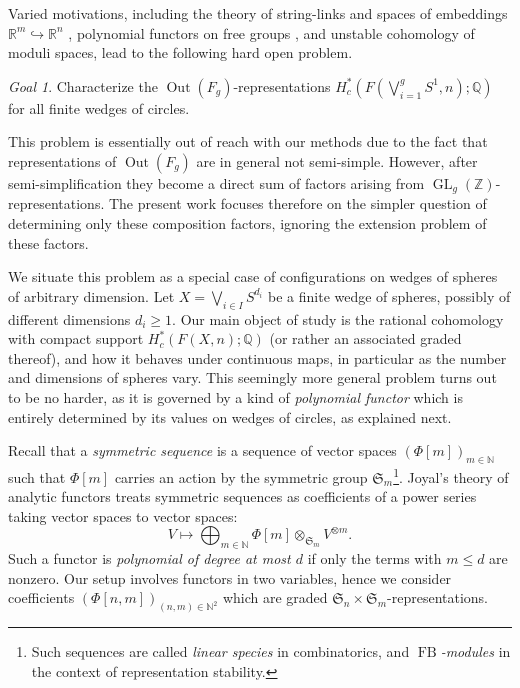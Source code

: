 \documentclass[12pt]{article}
\newcommand{\Z}{\mathbb{Z}}
\newcommand{\Q}{\mathbb{Q}}
\newcommand{\R}{\mathbb{R}}
\newcommand{\SymGroup}[1][n]{\mathfrak{S}_{#1}}
\newcommand{\into}{\hookrightarrow}
\DeclareMathOperator{\FB}{FB}
\DeclareMathOperator{\GL}{GL}
\DeclareMathOperator{\Out}{Out}
\theoremstyle{plain}
\theoremstyle{definition}
\theoremstyle{remark}
\newtheorem{goal}[thm]{Goal}
\begin{document}
Varied motivations, including the theory of string-links and spaces of embeddings $\R^m\into \R^n$ \cite{TW17,TW19}, polynomial functors on free groups \cite{HPV15,PV18}, and unstable cohomology of moduli spaces, lead to the following hard open problem.
\begin{goal}\label{goal:understand wedges of circles}
Characterize the $\Out(F_g)$-representations $H^*_c(F(\bigvee_{i=1}^g{S^1}, n); \Q)$ for all finite wedges of circles.
\end{goal}

This problem is essentially out of reach with our methods due to the fact that representations of $\Out(F_g)$ are in general not semi-simple. However, after semi-simplification they become a direct sum of factors arising from $\GL_g(\Z)$-representations. The present work focuses therefore on the simpler question of determining only these composition factors, ignoring the extension problem of these factors.

We situate this problem as a special case of configurations on wedges of spheres of arbitrary dimension. Let $X = \bigvee_{i\in I} S^{d_i}$ be a finite wedge of spheres, possibly of different dimensions $d_i \geq 1$. %
Our main object of study is the rational cohomology with compact support $H^*_c(F(X,n);\Q)$ (or rather an associated graded thereof), and how it behaves under continuous maps, in particular as the number and dimensions of spheres vary.
This seemingly more general problem turns out to be no harder, as it is governed by a kind of \emph{polynomial functor} which is entirely determined by its values on wedges of circles, as explained next.

Recall that a \emph{symmetric sequence} is a sequence of vector spaces $(\Phi[m])_{m\in \mathbb{N}}$ such that $\Phi[m]$ carries an action by the symmetric group $\SymGroup[m]$\footnote{Such sequences are called \emph{linear species} in combinatorics, and \emph{$\FB$-modules} in the context of representation stability.}. Joyal's theory of analytic functors treats symmetric sequences as coefficients of a power series taking vector spaces to vector spaces:
\[
V \longmapsto \bigoplus_{m\in \mathbb{N}} \Phi[m] \otimes_{\SymGroup[m]} V^{\otimes m}.
\]
Such a functor is \emph{polynomial of degree at most $d$} if only the terms with $m\leq d$ are nonzero. Our setup involves functors in two variables, hence we consider coefficients $(\Phi[n,m])_{(n,m)\in \mathbb{N}^2}$ which are graded $\SymGroup\times\SymGroup[m]$-representations.
\end{document}
